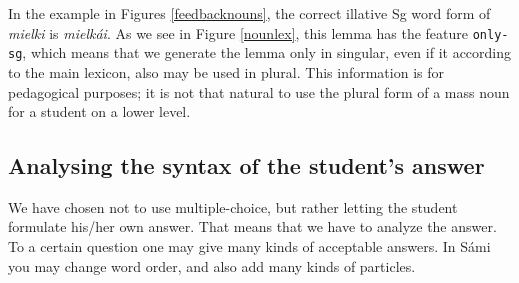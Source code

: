 \documentclass[11pt]{article}
\begin{document}
%


In the example in Figures \ref{feedbacknouns}, the correct illative Sg word form of \textit{mielki} is \textit{mielkái}. As we see in Figure \ref{nounlex}, this lemma has the feature \texttt{only-sg}, which means that we generate the lemma only in singular, even if it according to the main lexicon, also may be used in plural. This information is for pedagogical purposes; it is not that natural to use the plural form of a mass noun for a student on a lower level.


\subsection{Analysing the syntax of the student's answer} \label{sentencefeedback}
We have chosen not to use multiple-choice, but rather letting the student formulate his/her own answer. That means that we have to analyze the answer. To a certain question one may give many kinds of acceptable answers. In Sámi you may change word order, and also add many kinds of particles. \\
\end{document}

